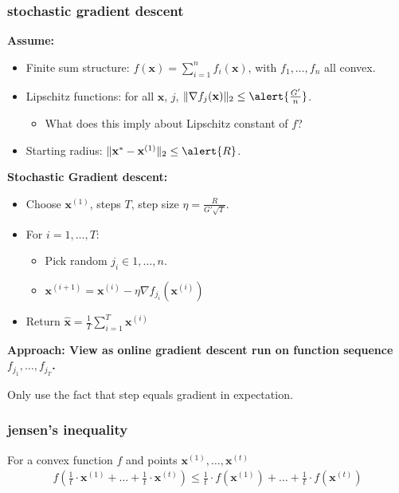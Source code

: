 \documentclass[compress]{beamer}
\newcommand{\bv}[1]{\mathbf{#1}}
\begin{document}
\begin{frame}[t]
	\frametitle{stochastic gradient descent}
	\small
		\vspace{-.5em}
	\textbf{Assume:}
	\vspace{-1em}
	\begin{itemize}
		\item {Finite sum structure:} $f(\bv{x}) = \sum_{i=1}^n f_i(\bv{x})$, with $f_1, \ldots, f_n$ all convex.
		\item {Lipschitz functions}: for all $\bv{x}$, $j$, $\|\nabla f_j(\bv{x})\|_2 \leq \alert{\frac{G'}{n}}$.
		\begin{itemize}
			\item What does this imply about Lipschitz constant of $f$?
		\end{itemize}
		\item Starting radius: $\|\bv{x}^{*} - \bv{x}^{(1)}\|_2 \leq \alert{R}$.
	\end{itemize}
	
	\vspace{-.5em}
	\textbf{Stochastic Gradient descent:}
	\vspace{-1em}
	\begin{itemize}
		\item Choose $\bv{x}^{(1)}$, steps $T$, step size $\eta = \frac{R}{G'\sqrt{T}}$.
		\item For $i = 1,\ldots, T$:
		\begin{itemize}
			\item Pick random $j_i \in 1, \ldots, n$.
			\item $\bv{x}^{(i+1)} = \bv{x}^{(i)} - \eta \nabla f_{j_i}(\bv{x}^{(i)})$
		\end{itemize}
		\item Return $\hat{\bv{x}} = \frac{1}{T}\sum_{i=1}^T \bv{x}^{(i)}$
	\end{itemize}
\alert{	\textbf{Approach: View as online gradient descent run on function sequence $f_{j_1}, \ldots, f_{j_T}$.} } 

Only use the fact that step equals gradient in expectation.
\end{frame}


\begin{frame}[t]
	\frametitle{jensen's inequality}
	For a convex function $f$ and points $\bv{x}^{(1)}, \ldots, \bv{x}^{(t)}$
	\begin{align*}
	f\left(\frac{1}{t}\cdot \bv{x}^{(1)} + \ldots + \frac{1}{t}\cdot \bv{x}^{(t)} \right) \leq \frac{1}{t}\cdot f(\bv{x}^{(1)}) + \ldots +\frac{1}{t} \cdot f(\bv{x}^{(t)} )
	\end{align*}
	
\end{frame}
\end{document}
